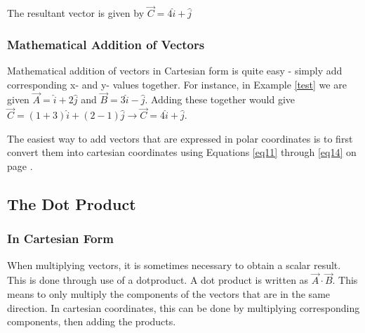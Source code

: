 \begin{mdframed}[backgroundcolor=blue!10!white]
\begin{center}
		
		
		
		
			
			
			
		\end{center}
		
		The resultant vector is given by $\boxed {\vec{C} = 4 \hat{i} + \hat{j}}$
		
	\end{mdframed}
	
	\subsubsection{Mathematical Addition of Vectors}
	Mathematical addition of vectors in Cartesian form is quite easy - simply add corresponding x- and y- values together.  For instance, in Example \ref{test} we are given  $\vec{A} =  \hat{i} + 2 \hat{j} $ and $\vec{B} = 3 \hat{i} - \hat{j} $.  Adding these together would give $\vec{C} = (1 +3) \hat{i} + (2-1)\hat{j} \longrightarrow \vec{C} =  4 \hat{i} + \hat{j} $.
	
	The easiest way to add vectors that are expressed in polar coordinates is to first convert them into cartesian coordinates using Equations \eqref{eq11} through \eqref{eq14} on page \pageref{eq11}.
	
	
	
	\subsection{The Dot Product}  
	\subsubsection{In Cartesian Form}
	When multiplying vectors, it is sometimes necessary to obtain a scalar result.  This is done through use of a \gls{dotproduct}.  A dot product is written as $\vec{A} \cdot \vec{B} $.  This means to only multiply the components of the vectors that are in the same direction.  In cartesian coordinates, this can be done by multiplying corresponding components, then adding the products.  
	
